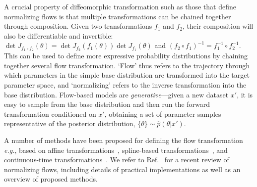 \documentclass[prd,aps,10pt,nofootinbib,twocolumn,superscriptaddress,preprintnumbers,balancelastpage,longbibliography,floatfix]{revtex4-2}
\begin{document}
A crucial property of diffeomorphic transformation such as those that define normalizing flows is that multiple transformations can be chained together through composition. Given two transformations $f_1$ and $f_2$, their composition will also be differentiable and invertible: $\operatorname{det}J_{f_{1}\circ f_2}(\theta) = \operatorname{det}J_{f_{2}}\left(f_1(\theta)\right)\operatorname{det}J_{f_{1}}(\theta)$ and $(f_2 \circ f_1)^{-1} = f_1^{-1} \circ f_2^{-1}$. This can be used to define more expressive probability distributions by chaining together several flow transformation. `Flow' thus refers to the trajectory through which parameters in the simple base distribution are transformed into the target parameter space, and `normalizing' refers to the inverse transformation into the base distribution. Flow-based models are \emph{generative}---given a new dataset $x'$, it is easy to sample from the base distribution and then run the forward transformation conditioned on $x'$, obtaining a set of parameter samples representative of the posterior distribution, $\{\theta\}\sim\hat p(\theta|x')$.

A number of methods have been proposed for defining the flow transformation \emph{e.g.}, based on affine transformations~\cite{10.5555/3294771.3294994,10.5555/3157382.3157627,DBLP:conf/iclr/DinhSB17,DBLP:journals/corr/DinhKB14}, spline-based transformations~\cite{DBLP:conf/nips/DurkanB0P19,durkan2019cubic}, and continuous-time transformations~\cite{DBLP:conf/iclr/GrathwohlCBSD19}. We refer to Ref.~\cite{papamakarios2019normalizing} for a recent review of normalizing flows, including details of practical implementations as well as an overview of proposed methods. \\
\end{document}
